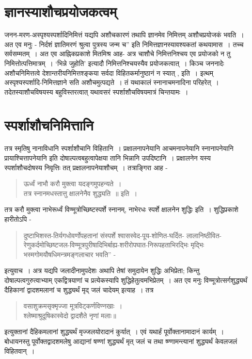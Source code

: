 {\section*{ज्ञानस्याशौचप्रयोजकत्वम्}  

जनन-मरण-अस्पृश्यस्पर्शादिनिमित्तं यद्यपि अशौचकारणं तथापि ज्ञानमेव निमित्तम् अशौचप्रयोजकं भवति~। अत एव मनुः - निर्दशं ज्ञातिमरणं श्रुत्वा पुत्रस्य जन्म च” इति निमित्तज्ञानस्यावश्यकतां कथयामास~। तच्च सर्वसम्मतम्~। अत एव आह्निकप्रकाशे मितमिश्र आह- अत्र चाशौचे निमित्तनिश्चय एव प्रयोजको न तु निमित्तोत्पत्तिमात्रम्~। ‘भिन्ने जुहोति’ इत्यादौ निमित्तनिश्चयस्यैव प्रयोजकत्वात्~। किञ्च जननादेः अशौचनिमित्तत्वे देशान्तरीयनिमित्तश्ङ्कया सर्वदा विहितकर्मानुष्ठानं न स्यात् , इति~। इत्थम् अस्पृश्यस्पर्शादि-निमित्तज्ञाने सति अशौचमुत्पद्यते~। तं यथाकालं स्नानाचमनादिना परिहरेत्~। तदेतस्याशौचविषयस्य बहुविस्तरत्वात् यथावसरं स्पर्शाशौचविषयमात्रं चिन्तयामः~। 

\section*{स्पर्शाशौचनिमित्तानि}

तत्र स्मृतिषु नानाविधानि स्पर्शाशौचानि विहितानि~। प्रक्षालनापनेयानि आचमनापनेयानि स्नानापनेयानि प्रायाश्चित्तापनेयानि इति दोषाल्पत्वबहुत्वापेक्षया तानि भिन्नानि उपदिष्टानि~। प्रक्षालनेन यस्य स्पर्शाशौचदोषस्य निवृत्तिः तत् प्रक्षालनापनेयाशौचम्~। तत्राङ्गिरा आह -
\begin{verse}
ऊर्ध्वं नाभौ करौ मुक्त्वा यदङ्गमुपहन्यते~। \\
तत्र स्नानमधस्तात्तु क्षालनेनैव शुद्ध्यति~॥ इति~। 
\end{verse}
तत्र करौ मुक्त्वा नाभेरूर्ध्वं विण्मूत्रोच्छिष्टस्पर्शे स्नानम्, नाभेरधः स्पर्शे क्षालनेन शुद्धिः इति~। शुद्धिप्रकाशे हारीतोऽपि - 
\begin{quote}
दुष्टाभिशस्त-तिर्यगधोवर्णोपहतानां संस्पर्शे श्वासस्वेद-पूय-शोणित-घर्दित- लालानिष्ठीवित-रेणुकर्दमोच्छिष्टजल-विण्मूत्रपुरीषादिभिर्बाह्य-शरीरोपघात-निरूपहताभिरद्भिः मृद्भिः भस्मगोमयौषधिमन्त्रमङ्गलाचार भवति” -
\end{quote}
इत्युवाच~। अत्र यद्यपि जलादीनामुपदेशः अथापि तेषां समुदायेन शुद्धिः अभिप्रेता; किन्तु दोषाल्पत्वगुरुत्वाभ्याम् एकद्वित्रयाणां च प्रत्येकस्यापि शुद्धिहेतुत्वमभिप्रेतम्~। अत एव मनुः विण्मूत्रोत्सर्गशुद्ध्यर्थं दैहिकानां द्वादशमलानां च शुद्ध्यर्थं मृद् जलं चादेयम् इत्याह~। तत्र 
\begin{verse}
वसाशुक्रमसृक्मृज्जा मूत्रविट्कर्णविण्नखाः~। \\
श्लेष्माश्रुदूषिकास्वेदो द्वादशैते नृणां मलाः॥
\end{verse}
इत्युक्तानां दैहिकमलानां शुद्ध्यर्थं मृज्जलयोरादानं कुर्यात्~। एवं यथार्हं पूर्वोक्तानामादानं कार्यम्~। बोधायनस्तु पूर्वोक्तद्वादशमलेषु आद्यानां षण्णां शुद्ध्यर्थं मृत् जलं च तथा ष्ण्णामन्त्यानां शुद्ध्यर्थं केवलजलं विहितवान्~। 

}
